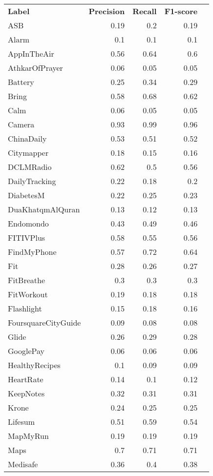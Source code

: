\begin{tabular}{lrrrr}
    \textbf{Label} & \textbf{Precision} & \textbf{Recall} & \textbf{F1-score} \\
    ASB & 0.19 & 0.2 & 0.19 \\
    Alarm & 0.1 & 0.1 & 0.1 \\
    AppInTheAir & 0.56 & 0.64 & 0.6 \\
    AthkarOfPrayer & 0.06 & 0.05 & 0.05 \\
    Battery & 0.25 & 0.34 & 0.29 \\
    Bring & 0.58 & 0.68 & 0.62 \\
    Calm & 0.06 & 0.05 & 0.05 \\
    Camera & 0.93 & 0.99 & 0.96 \\
    ChinaDaily & 0.53 & 0.51 & 0.52 \\
    Citymapper & 0.18 & 0.15 & 0.16 \\
    DCLMRadio & 0.62 & 0.5 & 0.56 \\
    DailyTracking & 0.22 & 0.18 & 0.2 \\
    DiabetesM & 0.22 & 0.25 & 0.23 \\
    DuaKhatqmAlQuran & 0.13 & 0.12 & 0.13 \\
    Endomondo & 0.43 & 0.49 & 0.46 \\
    FITIVPlus & 0.58 & 0.55 & 0.56 \\
    FindMyPhone & 0.57 & 0.72 & 0.64 \\
    Fit & 0.28 & 0.26 & 0.27 \\
    FitBreathe & 0.3 & 0.3 & 0.3 \\
    FitWorkout & 0.19 & 0.18 & 0.18 \\
    Flashlight & 0.15 & 0.18 & 0.16 \\
    FoursquareCityGuide & 0.09 & 0.08 & 0.08 \\
    Glide & 0.26 & 0.29 & 0.28 \\
    GooglePay & 0.06 & 0.06 & 0.06 \\
    HealthyRecipes & 0.1 & 0.09 & 0.09 \\
    HeartRate & 0.14 & 0.1 & 0.12 \\
    KeepNotes & 0.32 & 0.31 & 0.31 \\
    Krone & 0.24 & 0.25 & 0.25 \\
    Lifesum & 0.51 & 0.59 & 0.54 \\
    MapMyRun & 0.19 & 0.19 & 0.19 \\
    Maps & 0.7 & 0.71 & 0.71 \\
    Medisafe & 0.36 & 0.4 & 0.38 \\

\end{tabular}
